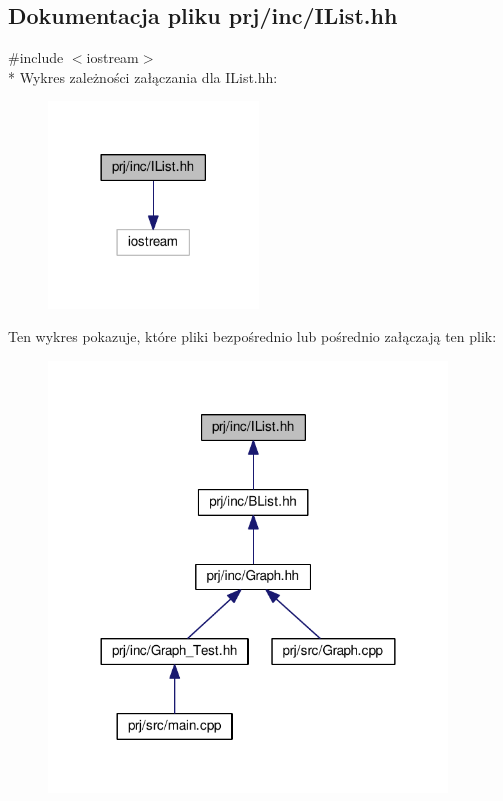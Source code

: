 \hypertarget{_i_list_8hh}{\subsection{Dokumentacja pliku prj/inc/\-I\-List.hh}
\label{_i_list_8hh}
}
{\ttfamily \#include $<$iostream$>$}\\*
Wykres zależności załączania dla I\-List.\-hh\-:
\nopagebreak
\begin{figure}[H]
\begin{center}
\leavevmode
\includegraphics[width=158pt]{_i_list_8hh__incl}
\end{center}
\end{figure}
Ten wykres pokazuje, które pliki bezpośrednio lub pośrednio załączają ten plik\-:
\nopagebreak
\begin{figure}[H]
\begin{center}
\leavevmode
\includegraphics[width=300pt]{_i_list_8hh__dep__incl}
\end{center}
\end{figure}
